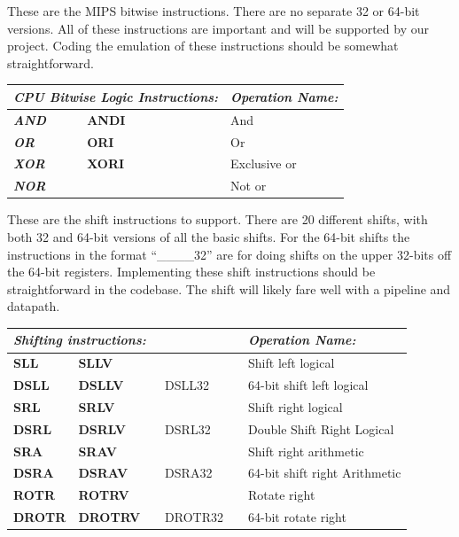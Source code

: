 \documentclass[
    parskip=half,
    fontsize=12pt,
    titlepage=firstiscover,
    toc=bibliography,
    numbers=endperiod
]{scrartcl}
\begin{document}
These are the MIPS bitwise instructions. There are no separate 32 or
64-bit versions. All of these instructions are important and will be
supported by our project. Coding the emulation of these instructions
should be somewhat straightforward.

\begin{tabularx}{\textwidth}{@{}lllll|X@{}}
    \multicolumn{5}{l|}{\emph{CPU Bitwise Logic Instructions:}} & \emph{Operation Name:} \\\hline
    \emph{\textbf{AND}} & \textbf{ANDI} & & &                   & And \\
    \emph{\textbf{OR}} & \textbf{ORI} & & &                     & Or \\
    \emph{\textbf{XOR}} & \textbf{XORI} & & &                   & Exclusive or \\
    \emph{\textbf{NOR}} & & & &                                 & Not or \\
\end{tabularx}

These are the shift instructions to support. There are 20 different
shifts, with both 32 and 64-bit versions of all the basic shifts.
For the 64-bit shifts the instructions in the format ``\_\_\_\_32'' are
for doing shifts on the upper 32-bits off the 64-bit registers.
Implementing these shift instructions should be straightforward in the
codebase. The shift will likely fare well with a pipeline and datapath.

\begin{tabularx}{\textwidth}{@{}lllll|X@{}}
    \multicolumn{5}{l|}{\emph{Shifting instructions:}} & \emph{Operation Name:} \\\hline
    \textbf{SLL} & \textbf{SLLV} & & &                 & Shift left logical \\
    \textbf{DSLL} & \textbf{DSLLV} & & DSLL32 &        & 64-bit shift left logical \\
    \textbf{SRL} & \textbf{SRLV} & & &                 & Shift right logical \\
    \textbf{DSRL} & \textbf{DSRLV} & & DSRL32 &        & Double Shift Right Logical \\
    \textbf{SRA} & \textbf{SRAV} & & &                 & Shift right arithmetic \\
    \textbf{DSRA} & \textbf{DSRAV} & & DSRA32 &        & 64-bit shift right Arithmetic \\
    \textbf{ROTR} & \textbf{ROTRV} & & &               & Rotate right \\
    \textbf{DROTR} & \textbf{DROTRV} & & DROTR32 &     & 64-bit rotate right \\
\end{tabularx}
\end{document}
